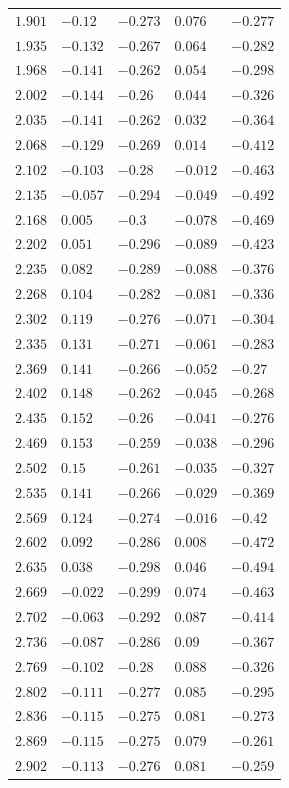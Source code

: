 \begin{table}[h]
\begin{tabular}{rllll}
$1.901$&$-0.12$&$-0.273$&$0.076$&$-0.277$\\
$1.935$&$-0.132$&$-0.267$&$0.064$&$-0.282$\\
$1.968$&$-0.141$&$-0.262$&$0.054$&$-0.298$\\
$2.002$&$-0.144$&$-0.26$&$0.044$&$-0.326$\\
$2.035$&$-0.141$&$-0.262$&$0.032$&$-0.364$\\
$2.068$&$-0.129$&$-0.269$&$0.014$&$-0.412$\\
$2.102$&$-0.103$&$-0.28$&$-0.012$&$-0.463$\\
$2.135$&$-0.057$&$-0.294$&$-0.049$&$-0.492$\\
$2.168$&$0.005$&$-0.3$&$-0.078$&$-0.469$\\
$2.202$&$0.051$&$-0.296$&$-0.089$&$-0.423$\\
$2.235$&$0.082$&$-0.289$&$-0.088$&$-0.376$\\
$2.268$&$0.104$&$-0.282$&$-0.081$&$-0.336$\\
$2.302$&$0.119$&$-0.276$&$-0.071$&$-0.304$\\
$2.335$&$0.131$&$-0.271$&$-0.061$&$-0.283$\\
$2.369$&$0.141$&$-0.266$&$-0.052$&$-0.27$\\
$2.402$&$0.148$&$-0.262$&$-0.045$&$-0.268$\\
$2.435$&$0.152$&$-0.26$&$-0.041$&$-0.276$\\
$2.469$&$0.153$&$-0.259$&$-0.038$&$-0.296$\\
$2.502$&$0.15$&$-0.261$&$-0.035$&$-0.327$\\
$2.535$&$0.141$&$-0.266$&$-0.029$&$-0.369$\\
$2.569$&$0.124$&$-0.274$&$-0.016$&$-0.42$\\
$2.602$&$0.092$&$-0.286$&$0.008$&$-0.472$\\
$2.635$&$0.038$&$-0.298$&$0.046$&$-0.494$\\
$2.669$&$-0.022$&$-0.299$&$0.074$&$-0.463$\\
$2.702$&$-0.063$&$-0.292$&$0.087$&$-0.414$\\
$2.736$&$-0.087$&$-0.286$&$0.09$&$-0.367$\\
$2.769$&$-0.102$&$-0.28$&$0.088$&$-0.326$\\
$2.802$&$-0.111$&$-0.277$&$0.085$&$-0.295$\\
$2.836$&$-0.115$&$-0.275$&$0.081$&$-0.273$\\
$2.869$&$-0.115$&$-0.275$&$0.079$&$-0.261$\\
$2.902$&$-0.113$&$-0.276$&$0.081$&$-0.259$\\

\end{tabular}
\end{table}
